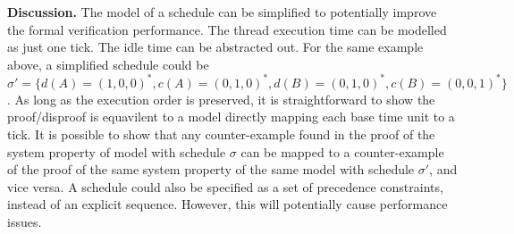 {\bf Discussion.}
The model of a schedule can be simplified to potentially improve the formal verification performance. The thread execution time can be modelled as just one tick. The idle time can be abstracted out. For the same example above, a simplified schedule could be  $\sigma' = \{d(A)=(1,0,0)^*, c(A) = (0,1,0)^*, d(B) = (0,1,0)^*, c(B) = (0,0,1)^*\}$. As long as the execution order is preserved, it is straightforward to show the proof/disproof is equavilent to a model directly mapping each base time unit to a tick. It is possible to show that any counter-example found in the proof of the system property of model with schedule $\sigma$ can be mapped to a counter-example of the proof of the same system property of the same model with schedule $\sigma'$,  and vice versa. A schedule could also be specified as a set of precedence constraints, instead of an explicit sequence. However, this will potentially cause performance issues.